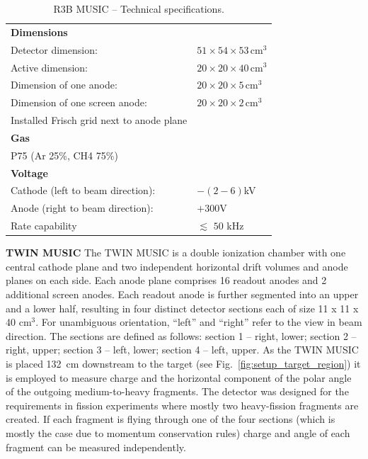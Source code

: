 \begin{table}[h!]
    \fontsize{10pt}{10pt}\selectfont
    \centering
    \begin{tabular}{ll}
        \hline
        \textbf{Dimensions} & \\ 
	Detector dimension: & $51\times54\times53\, \text{cm}^3$ \\ 
	Active dimension: & $20\times20\times40\, \text{cm}^3$\\
	Dimension of one anode:& $20\times20\times5\, \text{cm}^3$\\
	Dimension of one screen anode:& $20\times20\times2\, \text{cm}^3$\\
	Installed Frisch grid next to anode plane\\
	\textbf{Gas} &\\
	P75 (Ar 25\%, CH4 75\%) \\
	\textbf{Voltage} & \\
	Cathode (left to beam direction): &  $-(2-6)$kV \\
	Anode (right to beam direction): & $+300$V \\ [10pt]
	Rate capability & $\lesssim$ $50$ kHz \\
	\hline
    \end{tabular}
    \caption{R3B MUSIC -- Technical specifications.}
	\label{table:r3bmusic_tecs}
\end{table}
\newline
\textbf{TWIN MUSIC}\newline
The TWIN MUSIC is a double ionization chamber with one central cathode plane and two independent horizontal drift volumes and anode planes on each side. Each anode plane comprises 16 readout anodes and 2 additional screen anodes. Each readout anode is further segmented into an upper and a lower half, resulting in four distinct detector sections each of size 11 x 11 x 40 cm$^3$. For unambiguous orientation, “left” and “right” refer to the view in beam direction. The sections are defined as follows: section 1 -- right, lower; section 2 -- right, upper; section 3 -- left, lower; section 4 -- left, upper. As the TWIN MUSIC is placed 132~cm downstream to the target (see Fig.~\ref{fig:setup_target_region}) it is employed to measure charge and the horizontal component of the polar angle of the outgoing medium-to-heavy fragments. The detector was designed for the requirements in fission experiments where mostly two heavy-fission fragments are created. If each fragment is flying through one of the four sections (which is mostly the case due to momentum conservation rules) charge and angle of each fragment can be measured independently.\newline
